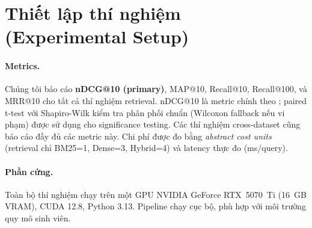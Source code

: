 \section{Thiết lập thí nghiệm (Experimental Setup)}
\label{sec:setup}

\paragraph{Metrics.}
Chúng tôi báo cáo \textbf{nDCG@10 (primary)}, MAP@10, Recall@10, Recall@100, và MRR@10 cho tất cả thí nghiệm retrieval. nDCG@10 là metric chính theo \cite{aljoofi2025scifact}; paired t-test với Shapiro-Wilk kiểm tra phân phối chuẩn (Wilcoxon fallback nếu vi phạm) được sử dụng cho significance testing. Các thí
nghiệm cross-dataset cũng báo cáo đầy đủ các metric này. Chi phí được đo bằng \emph{abstract cost units}
(retrieval chỉ BM25=1, Dense=3, Hybrid=4) và latency thực đo (ms/query).

\paragraph{Phần cứng.}
Toàn bộ thí nghiệm chạy trên một GPU NVIDIA GeForce RTX~5070~Ti (16~GB VRAM), CUDA 12.8, Python 3.13.
Pipeline chạy cục bộ, phù hợp với môi trường quy mô sinh viên.

